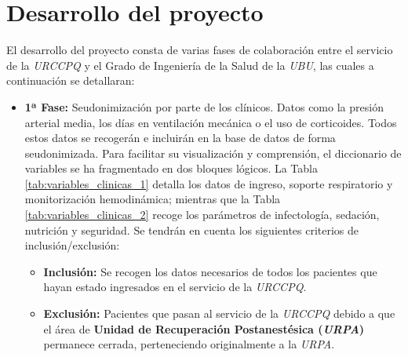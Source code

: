 \section{Desarrollo del proyecto}
El desarrollo del proyecto consta de varias fases de colaboración entre el servicio de la \textit{URCCPQ} y el Grado de Ingeniería de la Salud de la \textit{UBU}, las cuales a continuación se detallaran:
\begin{itemize}
    \item \textbf{1ª Fase:} Seudonimización por parte de los clínicos. Datos como la presión arterial media, los días en ventilación mecánica o el uso de corticoides. Todos estos datos se recogerán e incluirán en la base de datos de forma seudonimizada. Para facilitar su visualización y comprensión, el diccionario de variables se ha fragmentado en dos bloques lógicos. La Tabla \ref{tab:variables_clinicas_1} detalla los datos de ingreso, soporte respiratorio y monitorización hemodinámica; mientras que la Tabla \ref{tab:variables_clinicas_2} recoge los parámetros de infectología, sedación, nutrición y seguridad. Se tendrán en cuenta los siguientes criterios de inclusión/exclusión:
    \begin{itemize}
        \item \textbf{Inclusión:} Se recogen los datos necesarios de todos los pacientes que hayan estado ingresados en el servicio de la \textit{URCCPQ}. 
        \item \textbf{Exclusión:} Pacientes que pasan al servicio de la \textit{URCCPQ} debido a que el área de \textbf{Unidad de Recuperación Postanestésica (\textit{URPA})} permanece cerrada, perteneciendo originalmente a la \textit{URPA}. 
    \end{itemize}


\end{itemize}
